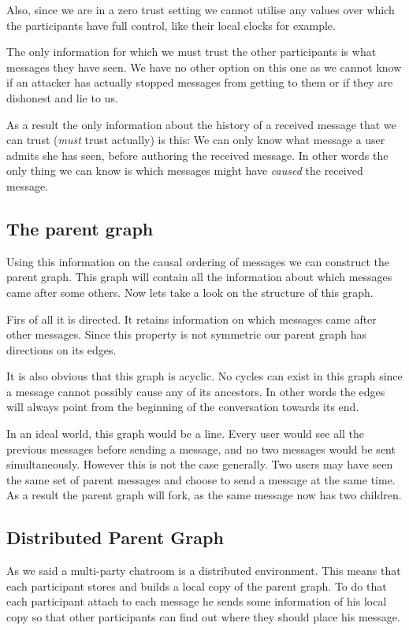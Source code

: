 Also, since we are in a zero trust setting we cannot utilise any values over which the participants have full control, like their local clocks for example.

The only information for which we must trust the other participants is what messages they have seen.
We have no other option on this one as we cannot know if an attacker has actually stopped messages from getting to them or if they are dishonest and lie to us.

As a result the only information about the history of a received message that we can trust (\emph{must} trust actually) is this:
We can only know what message a user admits she has seen, before authoring the received message.
In other words the only thing we can know is which messages might have \emph{caused} the received message.

\subsection{The parent graph}

Using this information on the causal ordering of messages we can construct the parent graph.
This graph will contain all the information about which messages came after some others.
Now lets take a look on the structure of this graph.

Firs of all it is directed.
It retains information on which messages came after other messages.
Since this property is not symmetric our parent graph has directions on its edges.

It is also obvious that this graph is acyclic.
No cycles can exist in this graph since a message cannot possibly cause any of its ancestors.
In other words the edges will always point from the beginning of the conversation towards its end.

In an ideal world, this graph would be a line.
Every user would see  all the previous messages before sending a message, and no two messages would be sent simultaneously.
However this is not the case generally.
Two users may have seen the same set of parent messages and choose to send a message at the same time.
As a result the parent graph will fork, as the same message now has two children.

\subsection{Distributed Parent Graph}

As we said a multi-party chatroom is a distributed environment.
This means that each participant stores and builds a local copy of the parent graph.
To do that each participant attach to each message he sends some information of his local copy so that other participants can find out where they should place his message.

